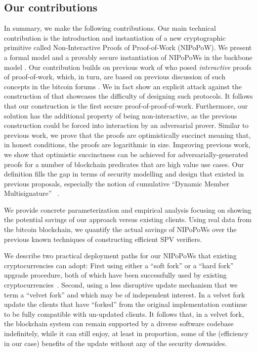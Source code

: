 \subsection{Our contributions}
In summary, we make the following contributions.
Our main technical contribution is the introduction and instantiation
of a new cryptographic
primitive called Non-Interactive Proofs of Proof-of-Work (NIPoPoW).
%
We present a formal model and a provably secure instantiation of NIPoPoWs in the
backbone model \cite{backbone}. Our contribution builds on previous work  of \cite{KLS} who posed {\em interactive} proofs of proof-of-work, which, in turn,
are based on previous discussion of such concepts in the bitcoin forums
\cite{highway}. We in fact show an explicit attack against the construction of \cite{KLS} that showcases the difficulty of designing such protocols. It follows
that our construction is the first secure proof-of-proof-of-work.
Furthermore, our solution has the additional property of being non-interactive,
as the previous construction could be forced into interaction by an adversarial
prover. Similar to previous work, we prove that the proofs are
optimistically succinct meaning that, in honest conditions, the proofs are
logarithmic in size. Improving previous work, we show that optimistic
succinctness can be achieved for adversarially-generated proofs for a number
of blockchain predicates that are high value use cases. Our definition
fills the gap in terms of security modelling and design that existed in previous
proposals, especially the notion of cumulative ``Dynamic Member Multisignature''
~\cite{sidechains}.

We provide concrete parameterization and empirical analysis focusing on showing
the potential savings of our approach versus existing clients. Using real data
from the bitcoin blockchain, we quantify the actual savings of NIPoPoWs over the
previous known techniques of constructing efficient SPV verifiers.

We describe two practical deployment paths for our NIPoPoWs that existing
cryptocurrencies can adopt: First using either a ``soft fork'' or a ``hard
fork'' upgrade procedure, both of which have been successfully used by existing
cryptocurrencies~\cite{sok}. Second, using a less disruptive update mechanism
that we term a ``velvet fork'' and which may be of independent interest. In a
velvet fork update the clients that have ``forked'' from the original
implementation continue to be fully compatible with un-updated clients. It
follows that, in a velvet fork, the blockchain system can remain supported by a
diverse software codebase indefinitely, while it can still enjoy, at least in
proportion, some of the (efficiency in our case) benefits of the update without
any of the security downsides.
